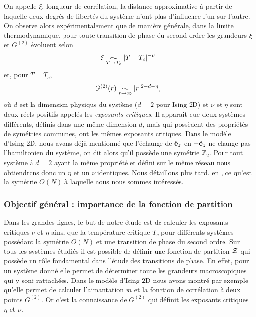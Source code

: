 \documentclass[10.5pt]{article}
\newcommand{\widesim}[2][1.5]{
  \mathrel{\underset{#2}{\scalebox{#1}[1]{$\sim$}}}
  }
\begin{document}
\begin{multicols*}{2}
On appelle $\xi$, longueur de corrélation, la distance approximative à partir de laquelle deux degrés de libertés du système n'ont plus d'influence l'un sur l'autre. On observe alors expérimentalement que de manière générale, dans la limite thermodynamique, pour toute transition de phase du second ordre les grandeurs $\xi$ et $G^{(2)}$ évoluent selon 
\begin{equation}
	\xi \widesim{T \to T_c} |T-T_c|^{-\nu}
\end{equation}
et, pour $T = T_c$,
\begin{equation}
	 G^{(2)}(r) \widesim{r \to \infty} |r|^{2-d-\eta},
\end{equation}
où $d$ est la dimension physique du système ($d=2$ pour Ising 2D) et $\nu$ et $\eta$ sont deux réels positifs appelés les \emph{exposants critiques}.  Il apparait que deux systèmes différents, définis dans une même dimension $d$, mais qui possèdent des propriétés de symétries communes, ont les mêmes exposants critiques. Dans le modèle d'Ising 2D, nous avons déjà mentionné que l'échange de $\hat{\mathbf{e}}_z$ en $-\hat{\mathbf{e}}_z$ ne change pas l'hamiltonien du système, on dit alors qu'il possède une symétrie $\mathbb{Z}_2$. Pour tout système à $d=2$ ayant la même propriété et défini sur le même réseau nous obtiendrons donc un $\eta$ et un $\nu$ identiques. Nous détaillons plus tard, en , ce qu'est la symétrie $O(N)$  à laquelle nous nous sommes intéressés. \\


\subsubsection{Objectif général : importance de la fonction de partition}

Dans les grandes lignes, le but de notre étude est de calculer les exposants critiques $\nu$ et $\eta$ ainsi que la température critique $T_c$ pour différents systèmes possédant la symétrie $O(N)$ et une transition de phase du second ordre. Sur tous les systèmes étudiés il est possible de définir une fonction de partition $\mathcal{Z}$ qui possède un rôle fondamental dans l'étude des transitions de phase. En effet, pour un système donné elle permet de déterminer toute les grandeurs macroscopiques qui y sont rattachées. Dans le modèle d'Ising 2D nous avons montré par exemple qu'elle permet de calculer l'aimantation $m$ et la fonction de corrélation à deux points $G^{(2)}$. Or c'est la connaissance de $G^{(2)}$ qui définit les exposants critiques $\eta$ et $\nu$.\\


\end{multicols*}
\end{document}
